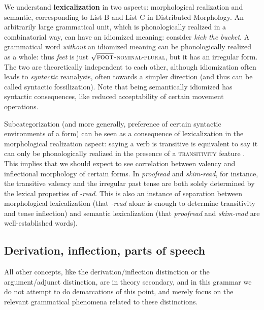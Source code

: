 \documentclass[UTF8, a4paper, oneside, scheme=plain, 12pt]{ctexrep}
\newcommand*{\concept}[1]{\textbf{#1}}
\newcommand{\form}[1]{\emph{#1}}
\newcommand*{\category}[1]{\textsc{#1}}
\newcommand*{\wordroot}[1]{$\sqrt{\text{\textsc{#1}}}$}
\begin{document}
{We understand \concept{lexicalization} in two aspects:
morphological realization and semantic,
corresponding to List B and List C in Distributed Morphology.
An arbitrarily large grammatical unit,
which is phonologically realized in a combinatorial way, can have an idiomized meaning:
consider \form{kick the bucket}.
A grammatical word \emph{without} an idiomized meaning
can be phonologically realized as a whole:
thus \form{feet} is just \wordroot{foot}-\category{nominal}-\category{plural},
but it has an irregular form.
The two are theoretically independent to each other,
although idiomization often leads to \emph{syntactic} reanalysis,
often towards a simpler direction (and thus can be called syntactic fossilization). 
Note that being semantically idiomized has syntactic consequences,
like reduced acceptability of certain movement operations.

Subcategorization (and more generally, preference of certain syntactic environments of a form) can be seen as a consequence of lexicalization in the morphological realization aspect:
saying a verb is transitive is equivalent to say it can only be phonologically realized
in the presence of a \category{transitivity} feature \citep{siddiqi2009syntax}.
This implies that we should expect to see correlation between valency and inflectional morphology of certain forms.
In \form{proofread} and \form{skim-read},
for instance, the transitive valency and the irregular past tense are both solely determined
by the lexical properties of \form{-read}.
This is also an instance of separation between morphological lexicalization
(that \form{-read} alone is enough to determine transitivity and tense inflection)
and semantic lexicalization
(that \form{proofread} and \form{skim-read} are well-established words).

\subsection{Derivation, inflection, parts of speech}\label{sec:intro.theory.pos}

All other concepts, like the derivation/inflection distinction
or the argument/adjunct distinction, are in theory secondary,
and in this grammar we do not attempt to do demarcations of this point,
and merely focus on the relevant grammatical phenomena related to these distinctions.

}
\end{document}
